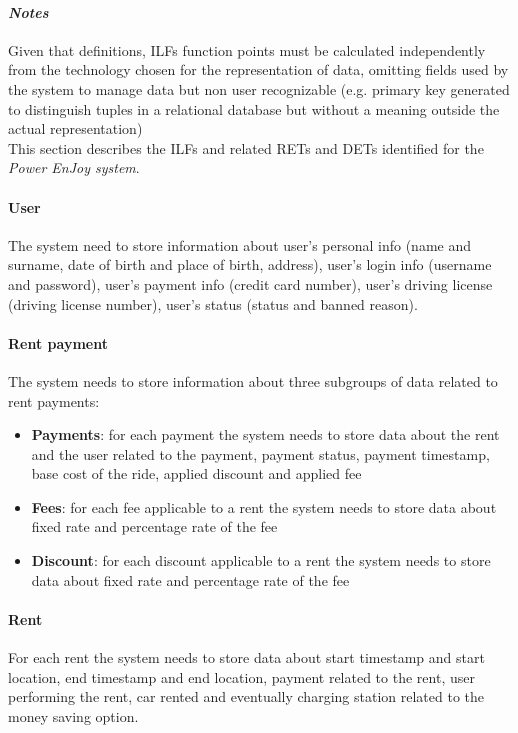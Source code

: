 \paragraph{\emph{Notes}} Given that definitions, ILFs function points must be calculated independently from the technology chosen for the representation of data, omitting fields used by the system to manage data but non user recognizable (e.g. primary key generated to distinguish tuples in a relational database but without a meaning outside the actual representation)\\ 

This section describes the ILFs and related RETs and DETs identified for the \emph{Power EnJoy system}.

\paragraph{User} The system need to store information about user's personal info (name and surname, date of birth and place of birth, address), user's login info (username and password), user's payment info (credit card number), user's driving license (driving license number), user's status (status and banned reason).

\paragraph{Rent payment} The system needs to store information about three subgroups of data related to rent payments:
\begin{itemize}
	\item \textbf{Payments}: for each payment the system needs to store data about the rent and the user related to the payment, payment status, payment timestamp, base cost of the ride, applied discount and applied fee
	\item \textbf{Fees}: for each fee applicable to a rent the system needs to store data about fixed rate and percentage rate of the fee
	\item \textbf{Discount}: for each discount applicable to a rent the system needs to store data about fixed rate and percentage rate of the fee
\end{itemize}

\paragraph{Rent} For each rent the system needs to store data about start timestamp and start location, end timestamp and end location, payment related to the rent, user performing the rent, car rented and eventually charging station related to the money saving option.

